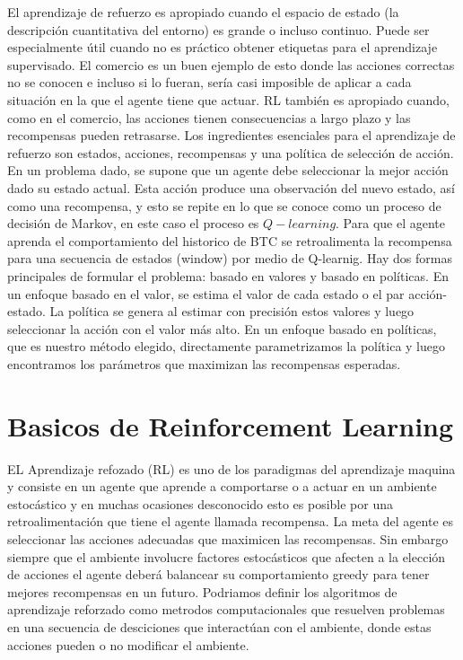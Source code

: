 \documentclass[12pt,letterpaper]{article}
\begin{document}
El aprendizaje de refuerzo es apropiado cuando el espacio de estado (la descripción cuantitativa del
entorno) es grande o incluso continuo. Puede ser especialmente útil cuando no es práctico obtener
etiquetas para el aprendizaje supervisado. El comercio es un buen ejemplo de esto donde las acciones
correctas no se conocen e incluso si lo fueran, sería casi imposible de aplicar a cada situación en la que
el agente tiene que actuar. RL también es apropiado cuando, como en el comercio, las acciones tienen
consecuencias a largo plazo y las recompensas pueden retrasarse. Los ingredientes esenciales para el
aprendizaje de refuerzo son estados, acciones, recompensas y una política de selección de acción. En
un problema dado, se supone que un agente debe seleccionar la mejor acción dado su estado actual.
Esta acción produce una observación del nuevo estado, así como una recompensa, y esto se repite en lo
que se conoce como un proceso de decisión de Markov, en este caso el proceso es $Q-learning$. Para que el agente aprenda el comportamiento del historico de BTC se retroalimenta la recompensa para una secuencia de estados (window) por medio de Q-learnig. Hay dos formas principales de formular el problema: basado en valores y
basado en políticas. En un enfoque basado en el valor, se estima el valor de cada estado o el par
acción- estado. La política se genera al estimar con precisión estos valores y luego seleccionar la acción
con el valor más alto. En un enfoque basado en políticas, que es nuestro método elegido, directamente
parametrizamos la política y luego encontramos los parámetros que maximizan las recompensas 
esperadas.


 \section{ Basicos de Reinforcement Learning}

EL Aprendizaje refozado (RL) es uno de los paradigmas del aprendizaje maquina y consiste en un agente que aprende a comportarse o a actuar en un ambiente estocástico y en muchas ocasiones desconocido esto es posible por una retroalimentación que tiene el agente llamada recompensa. La meta del agente es seleccionar las acciones adecuadas que maximicen las recompensas. Sin embargo siempre que el ambiente involucre factores estocásticos que afecten a la elección de acciones el agente deberá balancear su comportamiento greedy para tener mejores recompensas en un futuro. Podriamos definir los algoritmos de aprendizaje reforzado como metrodos computacionales que resuelven problemas en una secuencia de desciciones que interactúan con el ambiente, donde estas acciones pueden o no modificar el ambiente. 
\newline
\end{document}
